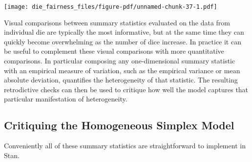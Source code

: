 \documentclass[
  letterpaper,
  DIV=11,
  numbers=noendperiod]{scrartcl}
\newenvironment{Shaded}{\begin{snugshade}}{\end{snugshade}}
\newcommand{\AttributeTok}[1]{\textcolor[rgb]{0.40,0.45,0.13}{#1}}
\newcommand{\ConstantTok}[1]{\textcolor[rgb]{0.56,0.35,0.01}{#1}}
\newcommand{\DecValTok}[1]{\textcolor[rgb]{0.68,0.00,0.00}{#1}}
\newcommand{\FloatTok}[1]{\textcolor[rgb]{0.68,0.00,0.00}{#1}}
\newcommand{\FunctionTok}[1]{\textcolor[rgb]{0.28,0.35,0.67}{#1}}
\newcommand{\NormalTok}[1]{\textcolor[rgb]{0.00,0.23,0.31}{#1}}
\newcommand{\OtherTok}[1]{\textcolor[rgb]{0.00,0.23,0.31}{#1}}
\newcommand{\SpecialCharTok}[1]{\textcolor[rgb]{0.37,0.37,0.37}{#1}}
\newcommand{\StringTok}[1]{\textcolor[rgb]{0.13,0.47,0.30}{#1}}
\begin{document}
\begin{Shaded}
\end{Shaded}

\texttt{[image: die\_fairness\_files/figure-pdf/unnamed-chunk-37-1.pdf]}

Visual comparisons between summary statistics evaluated on the data from
individual die are typically the most informative, but at the same time
they can quickly become overwhelming as the number of dice increase. In
practice it can be useful to complement these visual comparisons with
more quantitative comparisons. In particular composing any
one-dimensional summary statistic with an empirical measure of
variation, such as the empirical variance or mean absolute deviation,
quantifies the heterogeneity of that statistic. The resulting
retrodictive checks can then be used to critique how well the model
captures that particular manifestation of heterogeneity.

\subsection{Critiquing the Homogeneous Simplex
Model}\label{critiquing-the-homogeneous-simplex-model}

Conveniently all of these summary statistics are straightforward to
implement in Stan.
\end{document}
